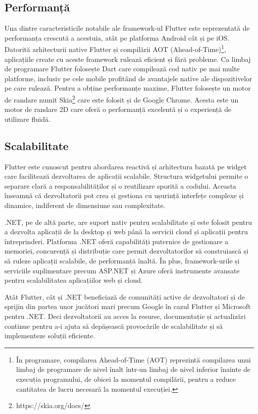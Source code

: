 \subsection{Performanță}

Una dintre caracteristicile notabile ale framework-ul Flutter este reprezentată de performanța crescută a acestuia, atât pe platforma Android cât și pe iOS. Datorită arhitecturii native Flutter și compilării AOT (Ahead-of-Time)\footnote{În programare, compilarea Ahead-of-Time (AOT) reprezintă compilarea unui limbaj de programare de nivel înalt într-un limbaj de nivel inferior înainte de execuția programului, de obicei la momentul compilării, pentru a reduce cantitatea de lucru necesară la momentul execuției.}, aplicațiile create cu aceste framework rulează eficient și fără probleme. Ca limbaj de programare Flutter folosește Dart care compilează cod nativ pe mai multe platforme, inclusiv pe cele mobile profitând de avantajele native ale dispozitivelor pe care rulează. Pentru a obține performanțe maxime, Flutter folosește un motor de randare numit Skia\footnote{https://skia.org/docs/} care este folosit și de Google Chrome. Acesta este un motor de randare 2D care oferă o performanță excelentă și o experiență de utilizare fluidă.

\subsection{Scalabilitate}

Flutter este cunoscut pentru abordarea reactivă și arhitectura bazată pe widget care facilitează dezvoltarea de aplicații scalabile. Structura widgetului permite o separare clară a responsabilităților și o reutilizare sporită a codului. Aceasta înseamnă că dezvoltatorii pot crea și gestiona cu ușurință interfețe complexe și dinamice, indiferent de dimensiune sau complexitate.

.NET, pe de altă parte, are suport nativ pentru scalabilitate și este folosit pentru a dezvolta aplicații de la desktop și web până la servicii cloud și aplicații pentru întreprinderi. Platforma .NET oferă capabilități puternice de gestionare a memoriei, concurență și distribuție care permit dezvoltatorilor să construiască și să ruleze aplicații scalabile, de performanță înaltă. În plus, framework-urile și serviciile suplimentare precum ASP.NET și Azure oferă instrumente avansate pentru scalabilitatea aplicațiilor web și cloud.

Atât Flutter, cât și .NET beneficiază de comunități active de dezvoltatori și de sprijin din partea unor jucători mari precum Google în cazul Flutter și Microsoft pentru .NET. Deci dezvoltatorii au acces la resurse, documentație și actualizări continue pentru a-i ajuta să depășească provocările de scalabilitate și să implementeze soluții eficiente.

